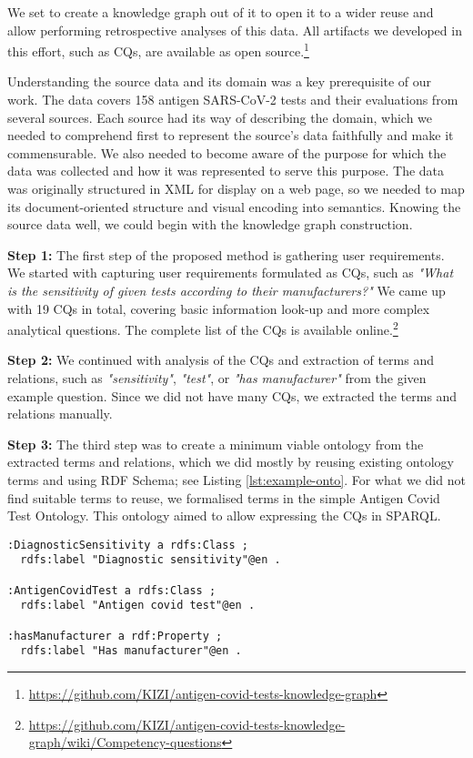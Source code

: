 \documentclass[
]{ceurart}
\begin{document}
We set to create a knowledge graph out of it to open it to a wider reuse and allow performing retrospective analyses of this data.
All artifacts we developed in this effort, such as CQs, are available as open source.\footnote{\url{https://github.com/KIZI/antigen-covid-tests-knowledge-graph}}

Understanding the source data and its domain was a key prerequisite of our work. The data covers 158 antigen SARS-CoV-2 tests and their evaluations from several sources. Each source had its way of describing the domain, which we needed to comprehend first to represent the source's data faithfully and make it commensurable. We also needed to become aware of the purpose for which the data was collected and how it was represented to serve this purpose. The data was originally structured in XML for display on a web page, so we needed to map its document-oriented structure and visual encoding into semantics. Knowing the source data well, we could begin with the knowledge graph construction.

\textbf{Step 1:} The first step of the proposed method is gathering user requirements. We started with capturing user requirements formulated as CQs, such as \textit{"What is the sensitivity of given tests according to their manufacturers?"} We came up with 19 CQs in total, covering basic information look-up and more complex analytical questions. The complete list of the CQs is available online.\footnote{\url{https://github.com/KIZI/antigen-covid-tests-knowledge-graph/wiki/Competency-questions}}

\textbf{Step 2:} We continued with analysis of the CQs and extraction of terms and relations, such as \textit{"sensitivity"}, \textit{"test"}, or \textit{"has manufacturer"} from the given example question. Since we did not have many CQs, we extracted the terms and relations manually.

\textbf{Step 3:} The third step was to create a minimum viable ontology from the extracted terms and relations, which we did mostly by reusing existing ontology terms and using RDF Schema; see Listing \ref{lst:example-onto}. For what we did not find suitable terms to reuse, we formalised terms in the simple Antigen Covid Test Ontology. This ontology aimed to allow expressing the CQs in SPARQL.

\begin{lstlisting}[language=turtle, caption=Example ontology terms, label={lst:example-onto}]
:DiagnosticSensitivity a rdfs:Class ;
  rdfs:label "Diagnostic sensitivity"@en .

:AntigenCovidTest a rdfs:Class ;
  rdfs:label "Antigen covid test"@en .

:hasManufacturer a rdf:Property ;
  rdfs:label "Has manufacturer"@en .
\end{lstlisting}
\end{document}
